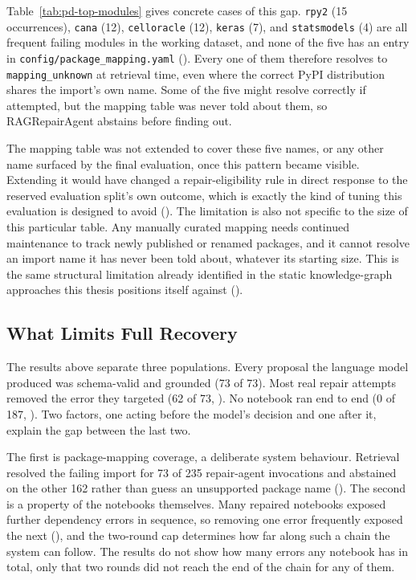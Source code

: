 \begin{sloppypar}
Table~\ref{tab:pd-top-modules} gives concrete cases of this gap.
\texttt{rpy2} (15 occurrences), \texttt{cana} (12), \texttt{celloracle} (12),
\texttt{keras} (7), and \texttt{statsmodels} (4) are all frequent failing
modules in the working dataset, and none of the five has an entry in
\texttt{config/}\allowbreak\texttt{package\_mapping.yaml}
(). Every one of them therefore resolves to
\texttt{mapping\_unknown} at retrieval time, even where the correct PyPI
distribution shares the import's own name. Some of the five might resolve
correctly if attempted, but the mapping table was never told about them,
so RAGRepairAgent abstains before finding out.
\end{sloppypar}

The mapping table was not extended to cover these five names, or any other
name surfaced by the final evaluation, once this pattern became visible.
Extending it would have changed a repair-eligibility rule in direct
response to the reserved evaluation split's own outcome, which is exactly
the kind of tuning this evaluation is designed to avoid
(). The limitation is also not specific to the
size of this particular table. Any manually curated mapping needs
continued maintenance to track newly published or renamed packages, and
it cannot resolve an import name it has never been told about, whatever
its starting size. This is the same structural limitation already
identified in the static knowledge-graph approaches this thesis positions
itself against ().

\subsection{What Limits Full Recovery}
\label{sec:v-final-interpretation}

The results above separate three populations. Every proposal the language
model produced was schema-valid and grounded (73 of 73). Most real repair
attempts removed the error they targeted (62 of 73,
). No notebook ran end to end (0 of 187,
). Two factors, one acting before the model's
decision and one after it, explain the gap between the last two.

The first is package-mapping coverage, a deliberate system behaviour.
Retrieval resolved the failing import for 73 of 235 repair-agent
invocations and abstained on the other 162 rather than guess an
unsupported package name (). The second is a
property of the notebooks themselves. Many repaired notebooks exposed
further dependency errors in sequence, so removing one error frequently
exposed the next (), and the two-round cap
determines how far along such a chain the system can follow. The results
do not show how
many errors any notebook has in total, only that two rounds did not reach
the end of the chain for any of them.

